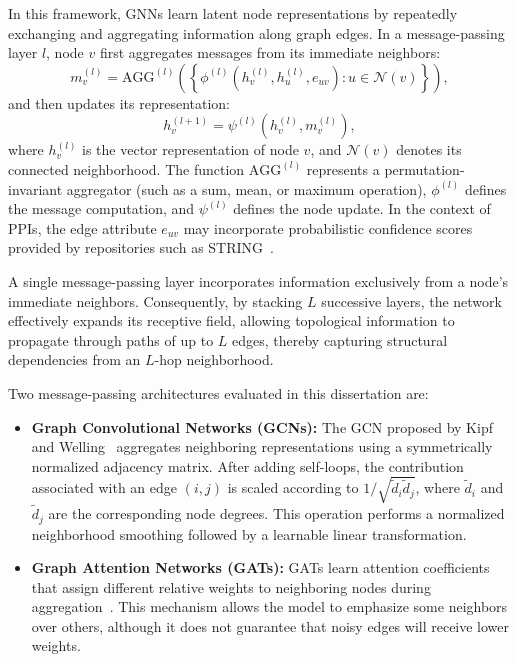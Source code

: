 \documentclass[Ingles]{ic-tese-v3}
\begin{document}
In this framework, GNNs learn latent node representations by repeatedly exchanging and aggregating information along graph edges. In a message-passing layer $l$, node $v$ first aggregates messages from its immediate neighbors:
\begin{equation*}
m_v^{(l)} = \text{AGG}^{(l)} \left( \left\{ \phi^{(l)} \left( h_v^{(l)}, h_u^{(l)}, e_{uv} \right) : u \in \mathcal{N}(v) \right\} \right),
\end{equation*}
\noindent and then updates its representation:
\begin{equation*}
h_v^{(l+1)} = \psi^{(l)} \left( h_v^{(l)}, m_v^{(l)} \right),
\end{equation*}
\noindent where $h_v^{(l)}$ is the vector representation of node $v$, and $\mathcal{N}(v)$ denotes its connected neighborhood. The function $\text{AGG}^{(l)}$ represents a permutation-invariant aggregator (such as a sum, mean, or maximum operation), $\phi^{(l)}$ defines the message computation, and $\psi^{(l)}$ defines the node update. In the context of PPIs, the edge attribute $e_{uv}$ may incorporate probabilistic confidence scores provided by repositories such as STRING~\cite{szklarczyk_string_2025}.

A single message-passing layer incorporates information exclusively from a node's immediate neighbors. Consequently, by stacking $L$ successive layers, the network effectively expands its receptive field, allowing topological information to propagate through paths of up to $L$ edges, thereby capturing structural dependencies from an $L$-hop neighborhood.

Two message-passing architectures evaluated in this dissertation are:

\begin{itemize}
    \item \textbf{Graph Convolutional Networks (GCNs):} The GCN proposed by Kipf and Welling~\cite{kipf2017semi} aggregates neighboring representations using a symmetrically normalized adjacency matrix. After adding self-loops, the contribution associated with an edge $(i, j)$ is scaled according to $1/\sqrt{\tilde{d}_i\tilde{d}_j}$, where $\tilde{d}_i$ and $\tilde{d}_j$ are the corresponding node degrees. This operation performs a normalized neighborhood smoothing followed by a learnable linear transformation.
    
    \item \textbf{Graph Attention Networks (GATs):} GATs learn attention coefficients that assign different relative weights to neighboring nodes during aggregation~\cite{velickovic2018graph}. This mechanism allows the model to emphasize some neighbors over others, although it does not guarantee that noisy edges will receive lower weights.
\end{itemize}
\end{document}
